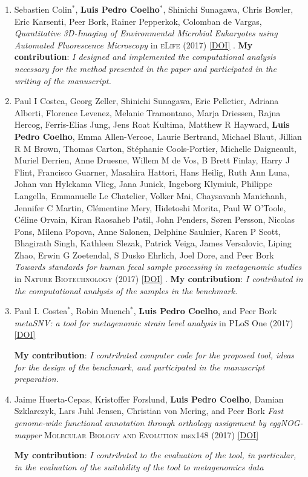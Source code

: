 \documentclass{article}
\newcommand\showdoi[1]{%
    \href{http://dx.doi.org/#1}{[DOI]}%
}
\newcommand\pubname[1]{\textsc{#1}}
\newcommand\contribution[1]{\relax\hfill\break\textbf{My contribution}: \textit{#1}}
\begin{document}
\begin{enumerate}[resume]
\item Sebastien Colin${}^{*}$, \textbf{Luis Pedro Coelho}${}^{*}$,
Shinichi Sunagawa, Chris Bowler, Eric Karsenti, Peer Bork, Rainer Pepperkok,
Colomban de Vargas, \emph{Quantitative 3D-Imaging of Environmental Microbial
Eukaryotes using Automated Fluorescence Microscopy}
in \pubname{eLife} (2017) \showdoi{10.7554/eLife.26066.001}.
\contribution{I designed and implemented the computational analysis necessary
for the method presented in the paper and participated in the writing of the
manuscript.}

\item Paul I Costea, Georg Zeller, Shinichi Sunagawa, Eric Pelletier, Adriana
Alberti, Florence Levenez, Melanie Tramontano, Marja Driessen, Rajna Hercog,
Ferris-Elias Jung, Jens Roat Kultima, Matthew R Hayward, \textbf{Luis Pedro
Coelho}, Emma Allen-Vercoe, Laurie Bertrand, Michael Blaut, Jillian R M Brown,
Thomas Carton, Stéphanie Cools-Portier, Michelle Daigneault, Muriel Derrien,
Anne Druesne, Willem M de Vos, B Brett Finlay, Harry J Flint, Francisco
Guarner, Masahira Hattori, Hans Heilig, Ruth Ann Luna, Johan van Hylckama
Vlieg, Jana Junick, Ingeborg Klymiuk, Philippe Langella, Emmanuelle Le
Chatelier, Volker Mai, Chaysavanh Manichanh, Jennifer C Martin, Clémentine
Mery, Hidetoshi Morita, Paul W O'Toole, Céline Orvain, Kiran Raosaheb Patil,
John Penders, Søren Persson, Nicolas Pons, Milena Popova, Anne Salonen,
Delphine Saulnier, Karen P Scott, Bhagirath Singh, Kathleen Slezak, Patrick
Veiga, James Versalovic, Liping Zhao, Erwin G Zoetendal, S Dusko Ehrlich, Joel
Dore, and Peer Bork \emph{Towards standards for human fecal sample processing
in metagenomic studies} in \pubname{Nature Biotechnology} (2017)
\showdoi{10.1038/nbt.3960}.
\contribution{I contributed in the computational analysis of the samples in the
benchmark.}

\item Paul I. Costea${}^{*}$, Robin Muench${}^{*}$, \textbf{Luis Pedro Coelho},
and Peer Bork \emph{metaSNV: a tool for metagenomic strain level analysis} in
PLoS One (2017) \showdoi{10.1371/journal.pone.0182392}
\contribution{I contributed computer code for the proposed tool, ideas for the
design of the benchmark, and participated in the manuscript preparation.}

\item Jaime Huerta-Cepas, Kristoffer Forslund, \textbf{Luis Pedro Coelho},
Damian Szklarczyk, Lars Juhl Jensen, Christian von Mering, and Peer Bork
\emph{Fast genome-wide functional annotation through orthology assignment by
eggNOG-mapper} \pubname{Molecular Biology and Evolution} msx148 (2017)
\showdoi{10.1093/molbev/msx148}
\contribution{I contributed to the evaluation of the tool, in particular, in
the evaluation of the suitability of the tool to metagenomics data}


\end{enumerate}
\end{document}
